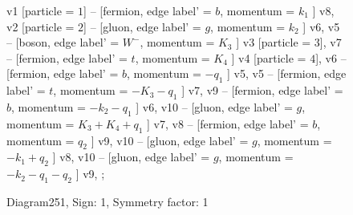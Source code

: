 \documentclass{revtex4}
\begin{document}
\begin{figure}[!htb]
\begin{center}
{v1 [particle = \(1\)] -- [fermion, edge label' = \(b\), momentum = \(k_{1}\) ] v8, 
v2 [particle = \(2\)] -- [gluon, edge label' = \(g\), momentum = \(k_{2}\) ] v6, 
v5 -- [boson, edge label' = \(W^{-}\), momentum = \(K_{3}\) ] v3 [particle = \(3\)], 
v7 -- [fermion, edge label' = \(t\), momentum = \(K_{4}\) ] v4 [particle = \(4\)], 
v6 -- [fermion, edge label' = \(b\), momentum = \(-q_{1}\) ] v5, 
v5 -- [fermion, edge label' = \(t\), momentum = \(-K_{3} - q_{1}\) ] v7, 
v9 -- [fermion, edge label' = \(b\), momentum = \(-k_{2} - q_{1}\) ] v6, 
v10 -- [gluon, edge label' = \(g\), momentum = \(K_{3} + K_{4} + q_{1}\) ] v7, 
v8 -- [fermion, edge label' = \(b\), momentum = \(q_{2}\) ] v9, 
v10 -- [gluon, edge label' = \(g\), momentum = \(-k_{1} + q_{2}\) ] v8, 
v10 -- [gluon, edge label' = \(g\), momentum = \(-k_{2} - q_{1} - q_{2}\) ] v9, 
};
\end{center}
\caption{Diagram251, Sign: 1, Symmetry factor: 1}
\end{figure}
\newpage
\end{document}
